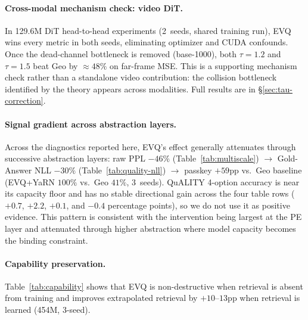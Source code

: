 \paragraph{Cross-modal mechanism check: video DiT.}
In 129.6M DiT head-to-head experiments (2~seeds, shared training run), EVQ wins every metric in both seeds, eliminating optimizer and CUDA confounds. Once the dead-channel bottleneck is removed (base-1000), both $\tau{=}1.2$ and $\tau{=}1.5$ beat Geo by ${\approx}48\%$ on far-frame MSE. This is a supporting mechanism check rather than a standalone video contribution: the collision bottleneck identified by the theory appears across modalities. Full results are in \S\ref{sec:tau-correction}.

\paragraph{Signal gradient across abstraction layers.}
Across the diagnostics reported here, EVQ's effect generally attenuates through successive abstraction layers: raw PPL $-46\%$ (Table~\ref{tab:multiscale}) $\to$ Gold-Answer NLL $-30\%$ (Table~\ref{tab:quality-nll}) $\to$ passkey $+59\mathrm{pp}$ vs.\ Geo baseline (EVQ+YaRN $100\%$ vs.\ Geo $41\%$, 3~seeds). QuALITY 4-option accuracy is near its capacity floor and has no stable directional gain across the four table rows ($+0.7$, $+2.2$, $+0.1$, and $-0.4$ percentage points), so we do not use it as positive evidence. This pattern is consistent with the intervention being largest at the PE layer and attenuated through higher abstraction where model capacity becomes the binding constraint.

\paragraph{Capability preservation.}
Table~\ref{tab:capability} shows that EVQ is non-destructive when retrieval is absent from training and improves extrapolated retrieval by $+10$--$13\mathrm{pp}$ when retrieval is learned (454M, 3-seed).



\FloatBarrier

